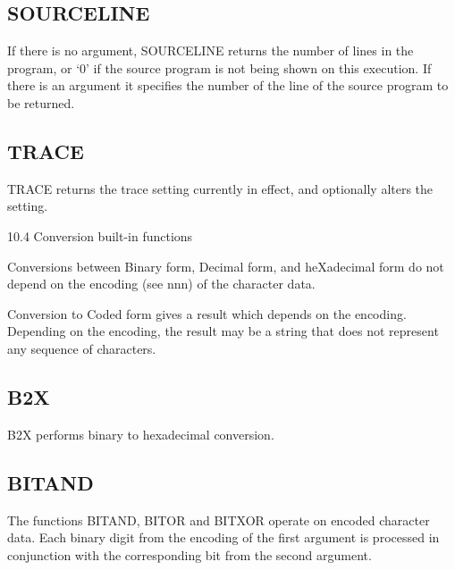 

\subsection{SOURCELINE}\label{sourceline}

If there is no argument, SOURCELINE returns the number of lines in the
program, or `0' if the source program is not being shown on this
execution. If there is an argument it specifies the number of the line
of the source program to be returned.



\subsection{TRACE}\label{trace}

TRACE returns the trace setting currently in effect, and optionally
alters the setting.



10.4 Conversion built-in functions

Conversions between Binary form, Decimal form, and heXadecimal form do
not depend on the encoding (see nnn) of the character data.

Conversion to Coded form gives a result which depends on the encoding.
Depending on the encoding, the result may be a string that does not
represent any sequence of characters.

\subsection{B2X}\label{b2x}

B2X performs binary to hexadecimal conversion.



\subsection{BITAND}\label{bitand}

The functions BITAND, BITOR and BITXOR operate on encoded character
data. Each binary digit from the encoding of the first argument is
processed in conjunction with the corresponding bit from the second
argument.

